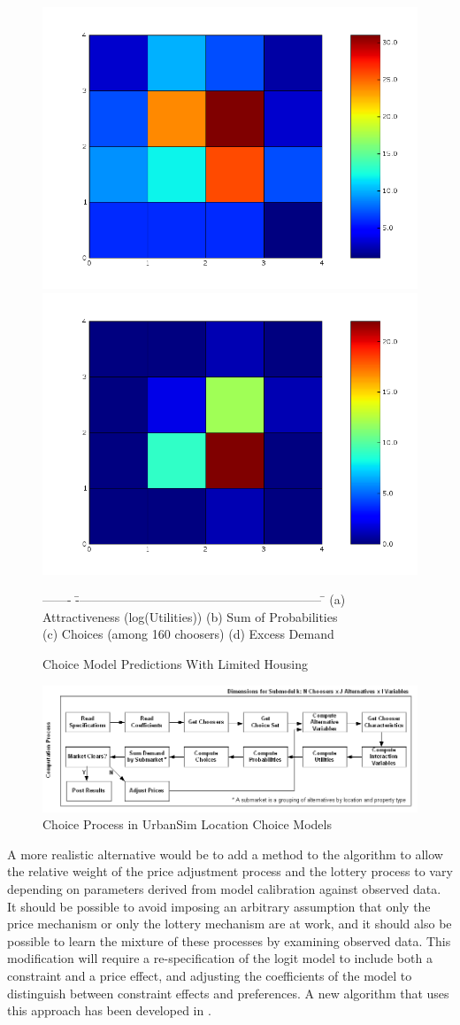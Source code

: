 \documentclass[12pt,a4paper]{article}
\begin{document}
\begin{figure}[h]
\centerline{
 \includegraphics[width=.25\textwidth,height=0.2\textwidth]
 {example_grid_count.png} \hspace{1cm}
 \includegraphics[width=.25\textwidth,height=0.2\textwidth]
 {example_grid_excess.png}}
\caption{\label{fig:grid1} Choice Model Predictions With Limited
Housing}

\begin{tabbing}
------- \= ------------------------------------------------------------ \= \kill
\> (a) Attractiveness (log(Utilities))  \> (b) Sum of
Probabilities \\  \> (c) Choices (among 160 choosers) \> (d)
Excess Demand
\end{tabbing}
\end{figure}



\begin{figure}[h]
\center
 \includegraphics[width=6.5in]
 {ChoiceProcessWithPriceAdjustment.png}
\caption{Choice Process in UrbanSim Location Choice Models}
\label{fig:choiceprocess2}
\end{figure}


A more realistic alternative would be to add a method to the
algorithm to allow the relative weight of the price adjustment
process and the lottery process to vary depending on parameters
derived from model calibration against observed data.  It should be
possible to avoid imposing an arbitrary assumption that only the
price mechanism or only the lottery mechanism are at work, and it
should also be possible to learn the mixture of these processes by
examining observed data. This modification will require a
re-specification of the logit model to include both a constraint and
a price effect, and adjusting the coefficients of the model to
distinguish between constraint effects and preferences.  A new
algorithm that uses this approach has been developed in
\cite{depalma-jue-2007}.
\end{document}
